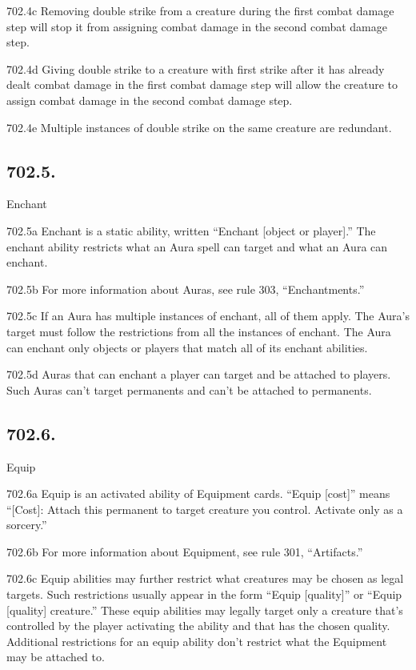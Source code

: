 702.4c Removing double strike from a creature during the first combat damage step will stop it from assigning combat damage in the second combat damage step.

702.4d Giving double strike to a creature with first strike after it has already dealt combat damage in the first combat damage step will allow the creature to assign combat damage in the second combat damage step.

702.4e Multiple instances of double strike on the same creature are redundant.

\subsection*{702.5.}
Enchant

702.5a Enchant is a static ability, written “Enchant [object or player].” The enchant ability restricts what an Aura spell can target and what an Aura can enchant.

702.5b For more information about Auras, see rule 303, “Enchantments.”

702.5c If an Aura has multiple instances of enchant, all of them apply. The Aura’s target must follow the restrictions from all the instances of enchant. The Aura can enchant only objects or players that match all of its enchant abilities.

702.5d Auras that can enchant a player can target and be attached to players. Such Auras can’t target permanents and can’t be attached to permanents.

\subsection*{702.6.}
Equip

702.6a Equip is an activated ability of Equipment cards. “Equip [cost]” means “[Cost]: Attach this permanent to target creature you control. Activate only as a sorcery.”

702.6b For more information about Equipment, see rule 301, “Artifacts.”

702.6c Equip abilities may further restrict what creatures may be chosen as legal targets. Such restrictions usually appear in the form “Equip [quality]” or “Equip [quality] creature.” These equip abilities may legally target only a creature that’s controlled by the player activating the ability and that has the chosen quality. Additional restrictions for an equip ability don’t restrict what the Equipment may be attached to.

